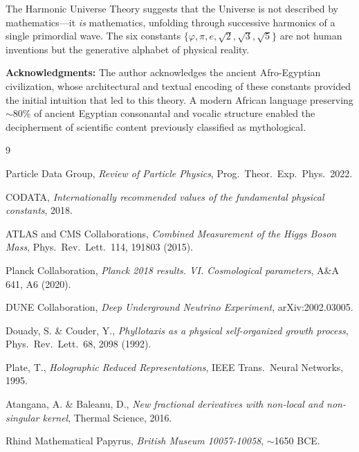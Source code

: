 \documentclass[12pt,a4paper]{article}
\begin{document}
The Harmonic Universe Theory suggests that the Universe is not described by mathematics---it \emph{is} mathematics, unfolding through successive harmonics of a single primordial wave. The six constants $\{\varphi, \pi, e, \sqrt{2}, \sqrt{3}, \sqrt{5}\}$ are not human inventions but the generative alphabet of physical reality.

\textbf{Acknowledgments:} The author acknowledges the ancient Afro-Egyptian civilization, whose architectural and textual encoding of these constants provided the initial intuition that led to this theory. A modern African language preserving $\sim$80\% of ancient Egyptian consonantal and vocalic structure enabled the decipherment of scientific content previously classified as mythological.

\begin{thebibliography}{9}

Particle Data Group, \emph{Review of Particle Physics}, Prog.\ Theor.\ Exp.\ Phys.\ 2022.

CODATA, \emph{Internationally recommended values of the fundamental physical constants}, 2018.

ATLAS and CMS Collaborations, \emph{Combined Measurement of the Higgs Boson Mass}, Phys.\ Rev.\ Lett.\ 114, 191803 (2015).

Planck Collaboration, \emph{Planck 2018 results. VI. Cosmological parameters}, A\&A 641, A6 (2020).

DUNE Collaboration, \emph{Deep Underground Neutrino Experiment}, arXiv:2002.03005.

Douady, S. \& Couder, Y., \emph{Phyllotaxis as a physical self-organized growth process}, Phys.\ Rev.\ Lett.\ 68, 2098 (1992).

Plate, T., \emph{Holographic Reduced Representations}, IEEE Trans.\ Neural Networks, 1995.

Atangana, A. \& Baleanu, D., \emph{New fractional derivatives with non-local and non-singular kernel}, Thermal Science, 2016.

Rhind Mathematical Papyrus, \emph{British Museum 10057-10058}, $\sim$1650 BCE.

\end{thebibliography}
\end{document}
